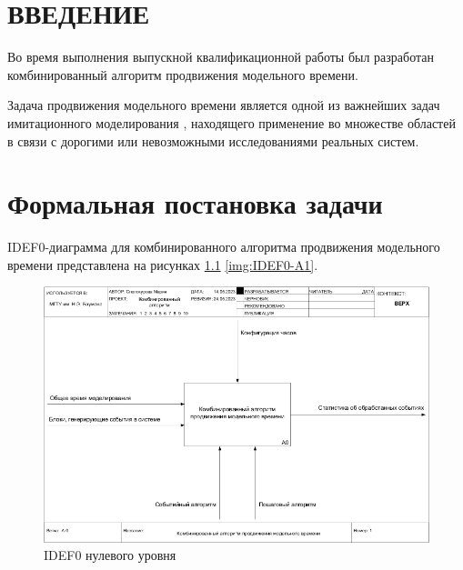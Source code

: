 \documentclass{bmstu}
\begin{document}
\def\labelitemi{--}
	
\setcounter{page}{3}
\maketableofcontents


\chapter*{ВВЕДЕНИЕ}
Во время выполнения выпускной квалификационной работы был разработан комбинированный алгоритм продвижения модельного времени.

Задача продвижения модельного времени является одной из важнейших задач имитационного моделирования \cite{imitation_modelling}, находящего применение во множестве областей в связи с дорогими или невозможными исследованиями реальных систем.

\chapter{Формальная постановка задачи}

IDEF0-диаграмма для комбинированного алгоритма продвижения модельного времени представлена на рисунках \ref{img:IDEF0-A0} \ref{img:IDEF0-A1}.

\begin{figure}[h!btp]
	\centering
	\includegraphics[width=1\columnwidth]{inc/img/IDEF0-A0.png}
	\caption{IDEF0 нулевого уровня}
	\label{img:IDEF0-A0}	
\end{figure}
\end{document}
